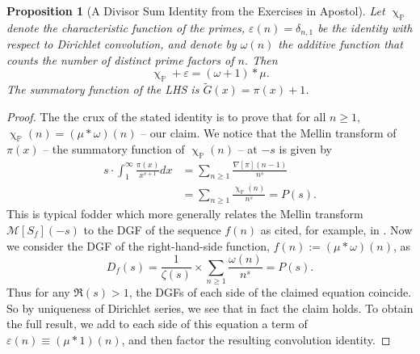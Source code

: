 \documentclass[11pt,reqno,a4letter]{article}
\numberwithin{figure}{section}
\numberwithin{table}{section}
\renewcommand{\chi}{\upchi}
\theoremstyle{plain}
\newtheorem{prop}[theorem]{Proposition}
\numberwithin{theorem}{section}
\theoremstyle{definition}
\begin{document}
\begin{prop}[A Divisor Sum Identity from the Exercises in Apostol] 
\label{prop_AntiqueDivisorSumIdent} 
Let $\chi_{\mathbb{P}}$ denote the characteristic function of the primes, 
$\varepsilon(n) = \delta_{n,1}$ be the identity with respect to Dirichlet convolution, 
and denote by $\omega(n)$ the additive function that counts the number of 
distinct prime factors of $n$. 
Then 
$$\chi_{\mathbb{P}} + \varepsilon = (\omega + 1) \ast \mu.$$ 
The summatory function of the LHS is $\widetilde{G}(x) = \pi(x)+1$.
\end{prop}
\begin{proof} 
The the crux of the stated identity is to prove that for all $n \geq 1$, 
$\chi_{\mathbb{P}}(n) = (\mu \ast \omega)(n)$ -- our claim. 
We notice that the Mellin transform of $\pi(x)$ -- the summatory function of 
$\chi_{\mathbb{P}}(n)$ -- at $-s$ is given by 
\begin{align*} 
s \cdot \int_1^{\infty} \frac{\pi(x)}{x^{s+1}} dx & = \sum_{n \geq 1} \frac{\nabla[\pi](n-1)}{n^s} \\ 
     & = \sum_{n \geq 1} \frac{\chi_{\mathbb{P}}(n)}{n^s} = P(s). 
\end{align*} 
This is typical fodder which more generally relates the Mellin transform $\mathcal{M}[S_f](-s)$ to the 
DGF of the sequence $f(n)$ as cited, for example, in \cite[\S 11]{APOSTOLANUMT}. Now we consider the 
DGF of the right-hand-side function, $f(n) := (\mu \ast \omega)(n)$, as 
\[
D_f(s) = \frac{1}{\zeta(s)} \times \sum_{n \geq 1} \frac{\omega(n)}{n^s} = P(s).  
\]
Thus for any $\Re(s) > 1$, the DGFs of each side of the 
claimed equation coincide. So by uniqueness of Dirichlet series, we see that in fact the claim 
holds. To obtain the full result, we add to each side of this equation a term of 
$\varepsilon(n) \equiv (\mu \ast 1)(n)$, and then factor the resulting convolution identity. 
\end{proof} 
\end{document}
